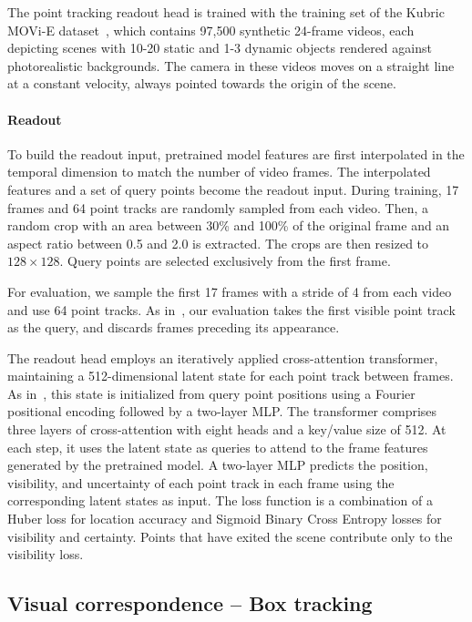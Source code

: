 The point tracking readout head is trained with the training set of the Kubric MOVi-E dataset~\cite{movi-e}, which contains 97,500 synthetic 24-frame videos, each depicting scenes with 10-20 static and 1-3 dynamic objects rendered against photorealistic backgrounds. The camera in these videos moves on a straight line at a constant velocity, always pointed towards the origin of the scene. 

\paragraph{Readout}
To build the readout input, pretrained model features are first interpolated in the temporal dimension to match the number of video frames. The interpolated features and a set of query points become the readout input. During training, 17 frames and 64 point tracks are randomly sampled from each video. Then, a random crop with an area between 30\% and 100\% of the original frame and an aspect ratio between 0.5 and 2.0 is extracted. The crops are then resized to $128\times 128$. Query points are selected exclusively from the first frame.

For evaluation, we sample the first 17 frames with a stride of 4 from each video and use 64 point tracks. As in~\citep{moog}, our evaluation takes the first visible point track as the query, and discards frames preceding its appearance.

The readout head employs an iteratively applied cross-attention transformer, maintaining a 512-dimensional latent state for each point track between frames. As in~\citep{moog}, this state is initialized from query point positions using a Fourier positional encoding followed by a two-layer MLP. The transformer comprises three layers of cross-attention with eight heads and a key/value size of 512. At each step, it uses the latent state as queries to attend to the frame features generated by the pretrained model. A two-layer MLP predicts the position, visibility, and uncertainty of each point track in each frame using the corresponding latent states as input. The loss function is a combination of a Huber loss for location accuracy and Sigmoid Binary Cross Entropy losses for visibility and certainty.  Points that have exited the scene contribute only to the visibility loss.

\subsection{Visual correspondence -- Box tracking}
